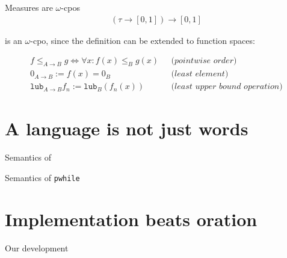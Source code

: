 \documentclass{beamer}
\begin{document}

\begin{frame}{Measures are $\omega$-cpos}
  \begin{align*}
    (\tau\to[0,1])\to[0,1]
  \end{align*}
  \pause
  \begin{center}
    is an $\omega$-cpo, since the definition can be extended to function spaces: 
  \end{center}
  \pause
  \begin{align*}
    f\leq_{A \to B} g \Leftrightarrow \forall x: f(x) \leq_B g(x)
    & ~~~\textit{(pointwise order)}\\
    0_{A\to B} := f(x) = 0_B
    & ~~~\textit{(least element)}\\
    \texttt{lub}_{A\to B} f_n := \texttt{lub}_B(f_n(x))
    & ~~~\textit{(least upper bound operation)}
  \end{align*}
\end{frame}


\section{A language is not just words}


\begin{frame}{Semantics of \rml}
  
\end{frame}


\begin{frame}{Semantics of \texttt{pwhile}}

\end{frame}


\section{Implementation beats oration}


\begin{frame}{Our development}

\end{frame}




\end{document}
